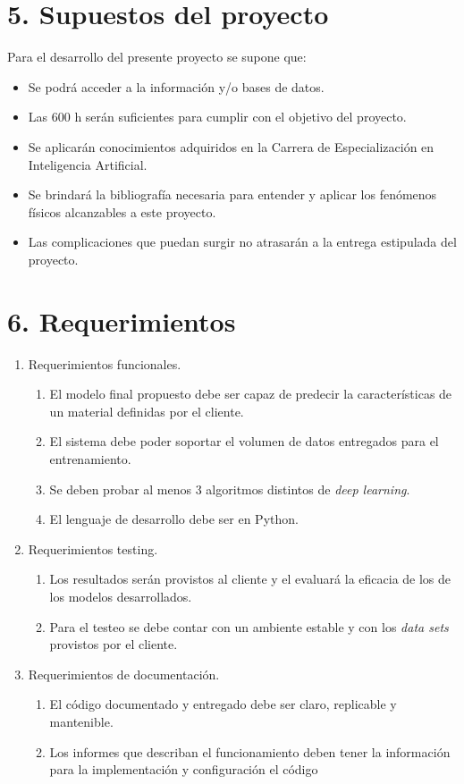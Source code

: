 \documentclass[
11pt, %
codirector, %
]{charter}
\begin{document}
\section{5. Supuestos del proyecto}
\label{sec:supuestos}


Para el desarrollo del presente proyecto se supone que:

\begin{itemize}
	\item Se podrá acceder a la información y/o bases de datos.
	\item Las 600 h serán suficientes para cumplir con el objetivo del proyecto.
	\item Se aplicarán conocimientos adquiridos en la Carrera de Especialización en Inteligencia Artificial.
	\item Se brindará la bibliografía necesaria para entender y aplicar los fenómenos físicos alcanzables a este proyecto.
	\item Las complicaciones que puedan surgir no atrasarán a la entrega estipulada del proyecto.
\end{itemize}


\section{6. Requerimientos}

\label{sec:requerimientos}

\begin{enumerate}
	\item Requerimientos funcionales.
		\begin{enumerate}
			\item El modelo final propuesto debe ser capaz de predecir la características
			de un material definidas por el cliente.
			\item El sistema debe poder soportar el volumen de datos entregados para el
			entrenamiento.
			\item Se deben probar al menos 3 algoritmos distintos de \textit{deep learning}.
			\item El lenguaje de desarrollo debe ser en Python.
		\end{enumerate}
	\item Requerimientos testing.
		\begin{enumerate}
			\item Los resultados serán provistos al cliente y el evaluará la eficacia de los
			de los modelos desarrollados.
			\item  Para el testeo se debe contar con un ambiente estable y con los 
			\textit{data sets} provistos por el cliente. 
		\end{enumerate}
	\item Requerimientos de documentación.
		\begin{enumerate}
			\item El código documentado y entregado debe ser claro, replicable y mantenible.
			\item Los informes que describan el funcionamiento deben tener la información para
			la implementación y configuración el código 
		\end{enumerate}
\end{enumerate}
\end{document}
